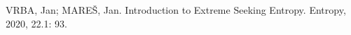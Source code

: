 \documentclass[11pt,twoside,openright]{report}
\begin{document}












\renewcommand{\bibname}{Publikace autora}
\begin{thebibliography}{A}
VRBA, Jan; MAREŠ, Jan. Introduction to Extreme Seeking Entropy. Entropy, 2020, 22.1: 93.

\end{thebibliography}


\renewcommand{\bibname}{Literatura}
\begin{thebibliography}{L}


\end{thebibliography}
\end{document}
